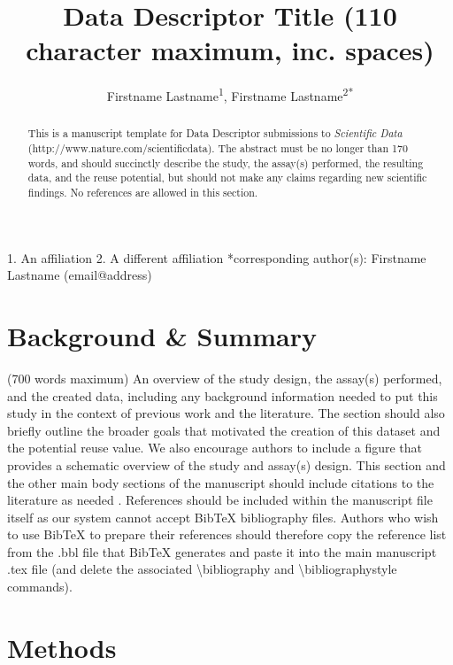 \documentclass[english]{article}
\begin{document}
\title{Data Descriptor Title (110 character maximum, inc. spaces)}

\author{Firstname Lastname\textsuperscript{1}, Firstname
Lastname\textsuperscript{2{*}}}

\maketitle
\thispagestyle{fancy}

1. An affiliation 2. A different affiliation {*}corresponding author(s):
Firstname Lastname (email@address)
\begin{abstract}
This is a manuscript template for Data Descriptor submissions to \emph{Scientific
Data} (http://www.nature.com/scientificdata). The abstract must be
no longer than 170 words, and should succinctly describe the study,
the assay(s) performed, the resulting data, and the reuse potential,
but should not make any claims regarding new scientific findings.
No references are allowed in this section. 
\end{abstract}

\section*{Background \& Summary}

(700 words maximum) An overview of the study design, the assay(s)
performed, and the created data, including any background information
needed to put this study in the context of previous work and the literature.
The section should also briefly outline the broader goals that motivated
the creation of this dataset and the potential reuse value. We also
encourage authors to include a figure that provides a schematic overview
of the study and assay(s) design. This section and the other main
body sections of the manuscript should include citations to the literature
as needed \cite{cite1, cite2}. References should be included within the 
manuscript file itself as our system cannot accept BibTeX bibliography files. 
Authors who wish to use BibTeX to prepare their references should therefore 
copy the reference list from the .bbl file that BibTeX generates and paste it 
into the main manuscript .tex file (and delete the associated 
\textbackslash{}bibliography and \textbackslash{}bibliographystyle commands).


\section*{Methods}
\end{document}
